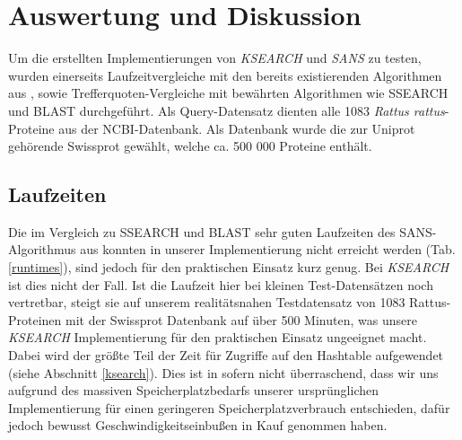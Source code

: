 \documentclass{article}
\begin{document}



\section{Auswertung und Diskussion}

Um die erstellten Implementierungen von \emph{KSEARCH} und \emph{SANS} zu testen, wurden einerseits Laufzeitvergleiche mit den bereits existierenden Algorithmen aus \cite{Holm}, sowie Trefferquoten-Vergleiche mit bewährten Algorithmen wie SSEARCH und BLAST durchgeführt. Als Query-Datensatz dienten alle 1083 \textit{Rattus rattus}-Proteine aus der NCBI-Datenbank. Als Datenbank wurde die zur Uniprot gehörende Swissprot gewählt, welche ca. 500 000 Proteine enthält.

\subsection{Laufzeiten}

Die im Vergleich zu SSEARCH und BLAST sehr guten Laufzeiten des SANS-Algorithmus aus \cite{Holm}
konnten in unserer Implementierung nicht erreicht werden (Tab. \ref{runtimes}), sind jedoch für den praktischen Einsatz kurz genug.
Bei \emph{KSEARCH} ist dies nicht der Fall. Ist die Laufzeit hier bei kleinen Test-Datensätzen noch vertretbar, steigt sie auf unserem realitätsnahen
Testdatensatz von 1083 Rattus-Proteinen mit der Swissprot Datenbank auf über 500 Minuten, was unsere \emph{KSEARCH} Implementierung für den
praktischen Einsatz ungeeignet macht. Dabei wird der größte Teil der Zeit für Zugriffe auf den Hashtable aufgewendet (siehe Abschnitt \ref{ksearch}). Dies ist in sofern nicht
überraschend, dass wir uns aufgrund des massiven Speicherplatzbedarfs unserer ursprünglichen Implementierung für einen geringeren
Speicherplatzverbrauch entschieden, dafür jedoch bewusst Geschwindigkeitseinbußen in Kauf genommen haben.
\end{document}
